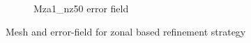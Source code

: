 \begin{figure}[H]
\begin{subfigure}[b]{0.475\textwidth}
\caption{Mza1\_nz50 error field}
\label{fig:Mza1_err_plot}
\end{subfigure}
\caption{Mesh and error-field for zonal based refinement strategy}
\end{figure}

